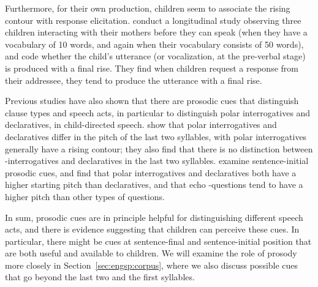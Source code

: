 Furthermore, for their own production, children seem to associate the rising contour with response elicitation. \textcite{flax1991prosody} conduct a longitudinal study observing three children interacting with their mothers before they can speak (when they have a vocabulary of 10 words, and again when their vocabulary consists of 50 words), and code whether the child's utterance (or vocalization, at the pre-verbal stage) is produced with a final rise. They find when children request a response from their addressee, they tend to produce the utterance with a final rise. 

Previous studies have also shown that there are prosodic cues that distinguish clause types and speech acts, in particular to distinguish polar interrogatives and declaratives, in child-directed speech. \textcite{geffenmintz2017final} show that polar interrogatives and declaratives differ in the pitch of the last two syllables, with polar interrogatives generally have a rising contour; they also find that there is no distinction between \twh-interrogatives and declaratives in the last two syllables. \textcite{chianggeffenmintz2018initial} examine sentence-initial prosodic cues, and find that polar interrogatives and declaratives both have a higher starting pitch than declaratives, and that echo \twh-questions tend to have a higher pitch than other types of questions. %

In sum, prosodic cues are in principle helpful for distinguishing different speech acts, and there is evidence suggesting that children can perceive these cues. In particular, there might be cues at sentence-final and sentence-initial position that are both useful and available to children. We will examine the role of prosody more closely in Section~\ref{sec:engsp:corpus}, where we also discuss possible cues that go beyond the last two and the first syllables.

